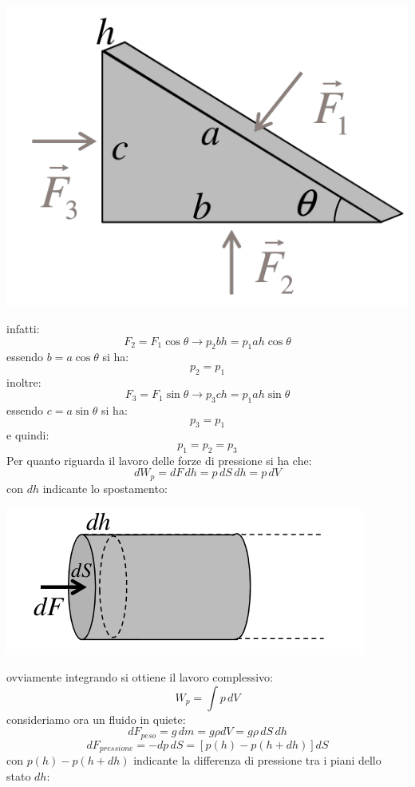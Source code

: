 \documentclass[a4paper,12pt, oneside]{book}
\begin{document}
\begin{center}
\includegraphics[scale=0.5]{img/flu.png}
\end{center}
infatti:
$$F_2=F_1\cos \theta\to p_2bh=p_1ah\cos\theta$$
essendo $b=a\cos\theta$ si ha:
$$p_2=p_1$$
inoltre:
$$F_3=F_1\sin \theta\to p_3ch=p_1ah\sin\theta$$
essendo $c=a\sin\theta$ si ha:
$$p_3=p_1$$
e quindi:
$$p_1=p_2=p_3$$
Per quanto riguarda il lavoro delle forze di pressione si ha che:
$$dW_p=dF\,dh=p\,dS\,dh=p\,dV$$
con $dh$ indicante lo spostamento:
\begin{center}
\includegraphics[scale=0.5]{img/flu2.png}
\end{center}
ovviamente integrando si ottiene il lavoro complessivo:
$$W_p=\int p\,dV$$
\newpage
consideriamo ora un fluido in quiete:
$$dF_{peso}=g\,dm=g\rho dV=g\rho \,dS\,dh$$
$$dF_{pressione}=-dp\,dS=[p(h)-p(h+dh)]dS$$
con $p(h)-p(h+dh)$ indicante la differenza di pressione tra i piani dello stato $dh$:
\end{document}
